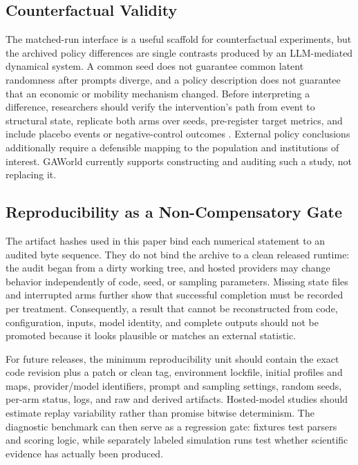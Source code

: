 \subsection{Counterfactual Validity}

The matched-run interface is a useful scaffold for counterfactual experiments,
but the archived policy differences are single contrasts produced by an
LLM-mediated dynamical system.  A common seed does not guarantee common latent
randomness after prompts diverge, and a policy description does not guarantee
that an economic or mobility mechanism changed.  Before interpreting a
difference, researchers should verify the intervention's path from event to
structural state, replicate both arms over seeds, pre-register target metrics,
and include placebo events or negative-control outcomes
\citep{lipsitch2010negative}.  External policy conclusions additionally require
a defensible mapping to the population and institutions of interest.  GAWorld
currently supports constructing and auditing such a study, not replacing it.

\subsection{Reproducibility as a Non-Compensatory Gate}

The artifact hashes used in this paper bind each numerical statement to an
audited byte sequence.  They do not bind the archive to a clean released
runtime: the audit began from a dirty working tree, and hosted providers may
change behavior independently of code, seed, or sampling parameters.  Missing
state files and interrupted arms further show that successful completion must
be recorded per treatment.  Consequently, a result that cannot be reconstructed
from code, configuration, inputs, model identity, and complete outputs should
not be promoted because it looks plausible or matches an external statistic.

For future releases, the minimum reproducibility unit should contain the exact
code revision plus a patch or clean tag, environment lockfile, initial
profiles and maps, provider/model identifiers, prompt and sampling settings,
random seeds, per-arm status, logs, and raw and derived artifacts.  Hosted-model
studies should estimate replay variability rather than promise bitwise
determinism.  The diagnostic benchmark can then serve as a regression gate:
fixtures test parsers and scoring logic, while separately labeled simulation
runs test whether scientific evidence has actually been produced.

